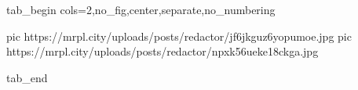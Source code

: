  
 
 
 
 


\ifcmt
  tab_begin cols=2,no_fig,center,separate,no_numbering

     pic https://mrpl.city/uploads/posts/redactor/jf6jkguz6yopumoe.jpg
     pic https://mrpl.city/uploads/posts/redactor/npxk56ueke18ckga.jpg

  tab_end
\fi
